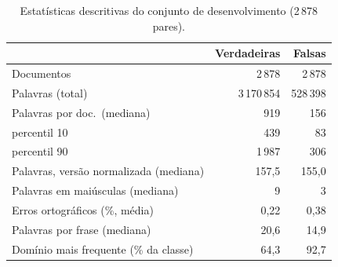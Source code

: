 \begin{table}[t]\centering\small\setlength{\tabcolsep}{10pt}
\caption{Estatísticas descritivas do conjunto de desenvolvimento (2\,878 pares).}\label{tab:corpus}
\begin{tabular}{lrr}
\toprule
& Verdadeiras & Falsas \\
\midrule
Documentos & 2\,878 & 2\,878 \\
Palavras (total) & 3\,170\,854 & 528\,398 \\
Palavras por doc.\ (mediana) & 919 & 156 \\
\quad percentil 10 & 439 & 83 \\
\quad percentil 90 & 1\,987 & 306 \\
Palavras, versão normalizada (mediana) & 157,5 & 155,0 \\
Palavras em maiúsculas (mediana) & 9 & 3 \\
Erros ortográficos (\%, média) & 0,22 & 0,38 \\
Palavras por frase (mediana) & 20,6 & 14,9 \\
Domínio mais frequente (\% da classe) & 64,3 & 92,7 \\
\bottomrule
\end{tabular}\par{}
\end{table}
